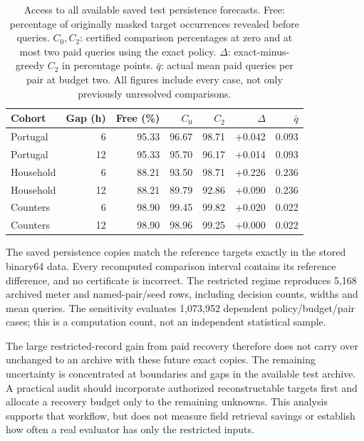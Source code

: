 \documentclass[12pt]{article}
\begin{document}
\begin{table}[htbp]
\centering\small
\caption{Access to all available saved test persistence forecasts. Free:
percentage of originally masked target occurrences revealed before queries.
$C_0,C_2$: certified comparison percentages at zero and at most two paid
queries using the exact policy. $\Delta$: exact-minus-greedy $C_2$ in
percentage points. $\bar q$: actual mean paid queries per pair at budget two.
All figures include every case, not only previously unresolved comparisons.}
\label{tab:archive-access}
\begin{tabular}{lrrrrrr}
\toprule
Cohort & Gap (h) & Free (\%) & $C_0$ & $C_2$ & $\Delta$ & $\bar q$\\
\midrule
Portugal & 6 & 95.33 & 96.67 & 98.71 & +0.042 & 0.093\\
Portugal & 12 & 95.33 & 95.70 & 96.17 & +0.014 & 0.093\\
Household & 6 & 88.21 & 93.50 & 98.71 & +0.226 & 0.236\\
Household & 12 & 88.21 & 89.79 & 92.86 & +0.090 & 0.236\\
Counters & 6 & 98.90 & 99.45 & 99.82 & +0.020 & 0.022\\
Counters & 12 & 98.90 & 98.96 & 99.25 & +0.000 & 0.022\\
\bottomrule
\end{tabular}
\end{table}
The saved persistence copies match the reference targets exactly in the
stored binary64 data. Every recomputed comparison interval contains its
reference difference, and no certificate is incorrect. The restricted
regime reproduces 5,168
archived meter and named-pair/seed rows, including decision counts,
widths and mean queries. The sensitivity evaluates 1,073,952
dependent policy/budget/pair cases; this is a computation count, not an
independent statistical sample.

The large restricted-record gain from paid recovery therefore does not
carry over unchanged to an archive with these future exact copies.
The remaining uncertainty is concentrated at boundaries and gaps in the
available test archive. A practical audit should incorporate authorized
reconstructable targets first and allocate a recovery budget only to the
remaining unknowns. This analysis supports that workflow, but does not
measure field retrieval savings or establish how often a real evaluator
has only the restricted inputs.

\FloatBarrier
\end{document}
